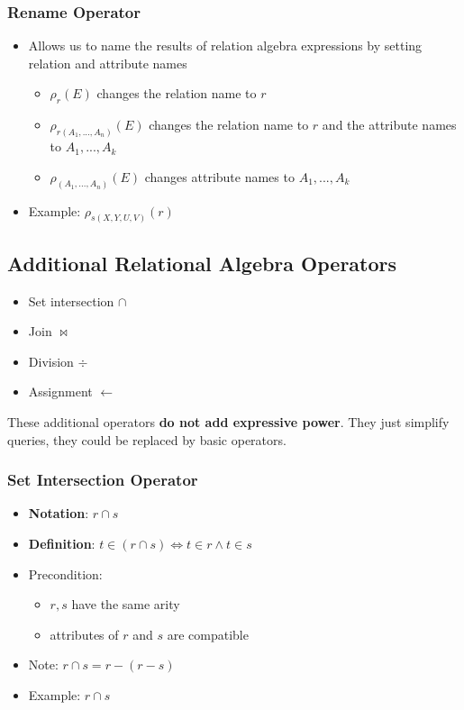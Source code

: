 \subsubsection{Rename Operator}
\begin{itemize}[label=\(\rhd\)]
    \item Allows us to name the results of relation algebra expressions by setting relation and attribute names
    \begin{itemize}[label=\(\rhd\)]
        \item $\rho_r(E)$ changes the relation name to $r$
        \item $\rho_{r(A_1,...,A_n)}(E)$ changes the relation name to $r$ and the attribute names to $A_1,...,A_k$
        \item $\rho_{(A_1,...,A_n)}(E)$ changes attribute names to $A_1,...,A_k$
    \end{itemize}
    \item Example: $\rho_{s(X,Y,U,V)}(r)$
\end{itemize}

\subsection{Additional Relational Algebra Operators}

\begin{itemize}[label=\(\rhd\)]
    \item Set intersection $\cap$
    \item Join $\bowtie$
    \item Division $\div$
    \item Assignment $\leftarrow$
\end{itemize}

These additional operators \textbf{do not add expressive power}. They just simplify queries, they could be replaced by basic operators.

\subsubsection{Set Intersection Operator}
\begin{itemize}[label=\(\rhd\)]
    \item \textbf{Notation}: $r \cap s$
    \item \textbf{Definition}: $t \in (r \cap s) \Leftrightarrow t \in r \land t \in s$
    \item Precondition:
    \begin{itemize}[label=\(\rhd\)]
        \item $r,s$ have the same arity
        \item attributes of $r$ and $s$ are compatible
    \end{itemize}
    \item Note: $r \cap s = r-(r-s)$
    \item Example: $r \cap s$
\end{itemize}

